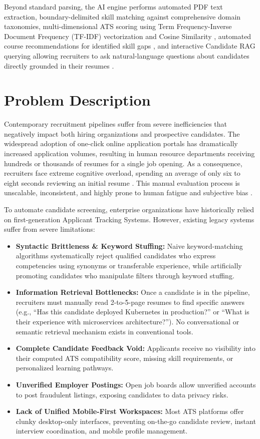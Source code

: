 Beyond standard parsing, the AI engine performs automated PDF text extraction, boundary-delimited skill matching against comprehensive domain taxonomies, multi-dimensional ATS scoring using Term Frequency-Inverse Document Frequency (TF-IDF) vectorization and Cosine Similarity \cite{salton1988term, sivaram2022nlp}, automated course recommendations for identified skill gaps \cite{karimi2020course}, and interactive Candidate RAG querying allowing recruiters to ask natural-language questions about candidates directly grounded in their resumes \cite{lewis2020rag}.

\section{Problem Description}
Contemporary recruitment pipelines suffer from severe inefficiencies that negatively impact both hiring organizations and prospective candidates. The widespread adoption of one-click online application portals has dramatically increased application volumes, resulting in human resource departments receiving hundreds or thousands of resumes for a single job opening. As a consequence, recruiters face extreme cognitive overload, spending an average of only six to eight seconds reviewing an initial resume \cite{parasuraman2021ats}. This manual evaluation process is unscalable, inconsistent, and highly prone to human fatigue and subjective bias \cite{kessler2021hiring}.

To automate candidate screening, enterprise organizations have historically relied on first-generation Applicant Tracking Systems. However, existing legacy systems suffer from severe limitations:
\begin{itemize}
    \item \textbf{Syntactic Brittleness \& Keyword Stuffing:} Naive keyword-matching algorithms systematically reject qualified candidates who express competencies using synonyms or transferable experience, while artificially promoting candidates who manipulate filters through keyword stuffing.
    \item \textbf{Information Retrieval Bottlenecks:} Once a candidate is in the pipeline, recruiters must manually read 2-to-5-page resumes to find specific answers (e.g., ``Has this candidate deployed Kubernetes in production?'' or ``What is their experience with microservices architecture?''). No conversational or semantic retrieval mechanism exists in conventional tools.
    \item \textbf{Complete Candidate Feedback Void:} Applicants receive no visibility into their computed ATS compatibility score, missing skill requirements, or personalized learning pathways.
    \item \textbf{Unverified Employer Postings:} Open job boards allow unverified accounts to post fraudulent listings, exposing candidates to data privacy risks.
    \item \textbf{Lack of Unified Mobile-First Workspaces:} Most ATS platforms offer clunky desktop-only interfaces, preventing on-the-go candidate review, instant interview coordination, and mobile profile management.
\end{itemize}

